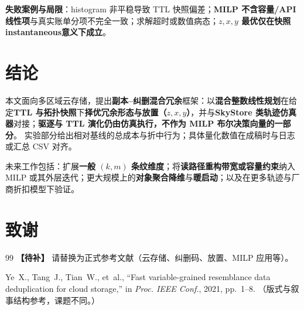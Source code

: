 \documentclass[conference]{IEEEtran}
\begin{document}
\textbf{失败案例与局限}：histogram 非平稳导致 TTL 快照偏差；\textbf{MILP 不含容量/API 线性项}与真实账单分项不完全一致；求解超时或数值病态；\textbf{$z,x,y$ 最优仅在快照instantaneous意义下成立}。

\section{结论}
\label{sec:conclusion}
本文面向多区域云存储，提出\textbf{副本--纠删混合冗余}框架：以\textbf{混合整数线性规划}在给定\textbf{TTL 与拓扑快照}下\textbf{择优冗余形态与放置（$z,x,y$）}，并与\textbf{SkyStore 类轨迹仿真器}对接；\textbf{驱逐与 TTL 演化仍由仿真执行，不作为 MILP 布尔决策向量的一部分}。
实验部分给出相对基线的总成本与折中行为；具体量化数值在成稿时与日志或汇总 CSV 对齐。

未来工作包括：扩展\textbf{一般 $(k,m)$ 条纹维度}；将\textbf{读路径重构带宽或容量约束}纳入 MILP 或其外层迭代；更大规模上的\textbf{对象聚合降维}与\textbf{暖启动}；以及在更多轨迹与厂商折扣模型下验证。

\section*{致谢}

\begin{thebibliography}{99}
\textbf{【待补】} 请替换为正式参考文献（云存储、纠删码、放置、MILP 应用等）。

Ye~X., Tang~J., Tian~W., et~al., ``Fast variable-grained resemblance data deduplication for cloud storage,'' in \textit{Proc. IEEE Conf.}, 2021, pp.~1--8. （版式与叙事结构参考，课题不同。）
\end{thebibliography}
\end{document}

